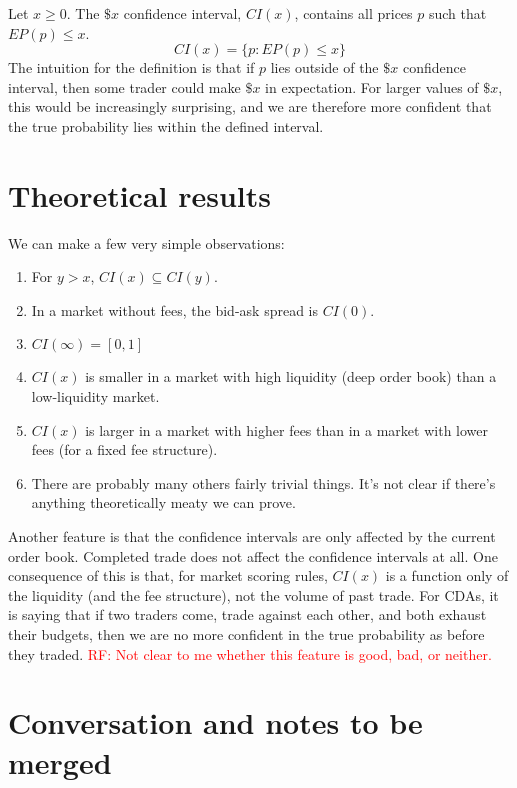 \documentclass{article}
\newcommand\RF[1]{\textcolor{red}{RF: #1}}
\begin{document}
Let $x \ge 0$. 
The $\$x$ confidence interval, $CI(x)$, contains all prices $p$ such that $EP(p) \le x$.
\[ CI(x) = \{ p: EP(p) \le x \} \]
The intuition for the definition is that if $p$ lies outside of the $\$x$ confidence interval, then some trader could make $\$x$ in expectation. 
For larger values of $\$x$, this would be increasingly surprising, and we are therefore more confident that the true probability lies within the defined interval.

\section{Theoretical results}

We can make a few very simple observations:
\begin{enumerate}
\item For $y > x$, $CI(x) \subseteq CI(y)$.
\item In a market without fees, the bid-ask spread is $CI(0)$.
\item $CI(\infty) = [0,1]$
\item $CI(x)$ is smaller in a market with high liquidity (deep order book) than a low-liquidity market.
\item $CI(x)$ is larger in a market with higher fees than in a market with lower fees (for a fixed fee structure).
\item There are probably many others fairly trivial things.
It's not clear if there's anything theoretically meaty we can prove. 
\end{enumerate}
	
Another feature is that the confidence intervals are only affected by the current order book. 
Completed trade does not affect the confidence intervals at all. 
One consequence of this is that, for market scoring rules, $CI(x)$ is a function only of the liquidity (and the fee structure), not the volume of past trade. 
For CDAs, it is saying that if two traders come, trade against each other, and both exhaust their budgets, then we are no more confident in the true probability as before they traded.
\RF{Not clear to me whether this feature is good, bad, or neither.}

\appendix

\section{Conversation and notes to be merged}
\end{document}
